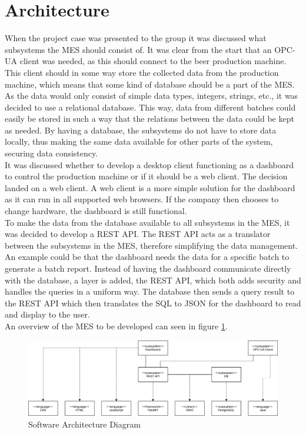 \section{Architecture}
When the project case was presented to the group it was discussed what
subsystems the MES should consist of. It was clear from the start that an OPC-UA
client was needed, as this should connect to the beer production machine. This
client should in some way store the collected data from the production machine,
which means that some kind of database should be a part of the MES. As the data
would only consist of simple data types, integers, strings, etc., it was decided
to use a relational database. This way, data from different batches could easily
be stored in such a way that the relations between the data could be kept as
needed. By having a database, the subsystems do not have to store data
locally, thus making the same data available for other parts of the system,
securing data consistency. \\

It was discussed whether to develop a desktop client functioning as a dashboard
to control the production machine or if it should be a web client. The decision
landed on a web client. A web client is a more simple solution for the dashboard
as it can run in all supported web browsers. If the company then chooses to
change hardware, the dashboard is still functional. \\
 

To make the data from the database available to all subsystems in the MES, 
it was decided to develop a REST API. The REST API acts as a translator
between the subsystems in the MES, therefore simplifying the data management.
An example could be that the dashboard needs the data for a specific batch to
generate a batch report. Instead of having the dashboard communicate directly
with the database, a layer is added, the REST API, which both adds security and
handles the queries in a uniform way. The database then sends a query result to
the REST API which then translates the SQL to JSON for the dashboard to read
and display to the user. \\

An overview of the MES to be developed can seen in figure
\ref{figure:architucture_diagram}.

\begin{figure}[ht]
	\centering 
	\includegraphics[scale=0.24]{images/diagrams/architecture_diagram.png}
	\caption{Software Architecture Diagram}
	\label{figure:architucture_diagram} 
\end{figure}

